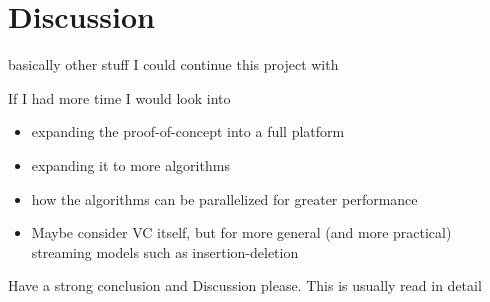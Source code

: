 \section{Discussion}

basically other stuff I could continue this project with

If I had more time I would look into

\begin{itemize}
    \item
          expanding the proof-of-concept into a full platform
    \item
          expanding it to more algorithms
    \item
          how the algorithms can be parallelized for greater performance
    \item
          Maybe consider VC itself, but for more general (and more practical)
          streaming models such as insertion-deletion
\end{itemize}

Have a strong conclusion and Discussion please. This is usually read in detail
